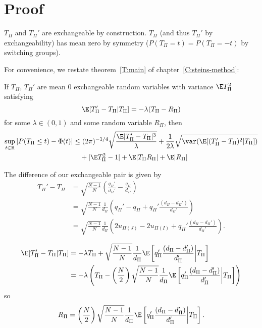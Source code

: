 \section{Proof}
$T_{\Pi}$ and $T_{\Pi}'$ are exchangeable by construction.  $T_{\Pi}$ (and thus $T_{\Pi}'$ by
exchangeability) has mean zero by symmetry ($P(T_{\Pi} = t) = P(T_{\Pi} = -t)$ by
switching groups).

For convenience, we restate theorem~\ref{T:main} of chapter~\ref{C:steins-method}:
\begin{theorem}
  If $T_{\Pi}$, $T_{\Pi}'$ are mean 0 exchangeable random variables with variance $\E T_{\Pi}^2$
  satisfying
  \begin{equation*}
    \E[T_{\Pi}'-T_{\Pi}|T_{\Pi}] = -\lambda(T_{\Pi}-R_{\Pi})    
  \end{equation*}
  for some $\lambda \in (0,1)$ and some random variable $R_{\Pi}$, then 
  \begin{equation*}
    \begin{split}
      \sup_{t \in \mathbb{R}} |P(T_{\Pi} \leq t) - \Phi(t)|
      &\leq (2\pi)^{-1/4} \sqrt{\frac{\E |T_{\Pi}'-T_{\Pi}|^3}{\lambda}}
      + \frac{1}{2\lambda} \sqrt{\var (\E [(T_{\Pi}'-T_{\Pi})^2|T_{\Pi}])} \\
      &\quad + |\E T_{\Pi}^2 - 1| + \E |T_{\Pi}R_{\Pi}| + \E |R_{\Pi}|
    \end{split}
  \end{equation*}
\end{theorem}

The difference of our exchangeable pair is given by
\begin{align}
  T_{\Pi}' - T_{\Pi}
  &= \sqrt{\frac{N-1}{N}}\left (\frac{q_{\Pi}'}{d_{\Pi}'}-\frac{q_{\Pi}}{d_{\Pi}}\right )
  \nonumber \\
  &= \sqrt{\frac{N-1}{N}}\frac{1}{d_{\Pi}}\left (q_{\Pi}' - q_{\Pi} +
    q_{\Pi}' \frac{(d_{\Pi}-d_{\Pi}')}{d_{\Pi}'}\right ) \nonumber \\
  &= \sqrt{\frac{N-1}{N}}\frac{1}{d_{\Pi}}\left
    (2u_{\Pi(J)} - 2u_{\Pi(I)} + q_{\Pi}' \frac{(d_{\Pi}-d_{\Pi}')}{d_{\Pi}'}\right ). \label{def:ttpcubed}
\end{align}

\begin{align*}
  \E[T_{\Pi}'-T_{\Pi}|T_{\Pi}] 
  &= - \lambda T_{\Pi} + \sqrt{\frac{N-1}{N}}\frac{1}{d_{\Pi}}
  \E\left [q_{\Pi}' \frac{(d_{\Pi}-d_{\Pi}')}{d_{\Pi}'}\middle |T_{\Pi} \right ] \\
  &= - \lambda \left ( T_{\Pi} - \left ( \frac{N}{2} \right ) 
    \sqrt{\frac{N-1}{N}}\frac{1}{d_{\Pi}}
    \E\left [q_{\Pi}' \frac{(d_{\Pi}-d_{\Pi}')}{d_{\Pi}'}\middle |T_{\Pi} \right ] \right ) 
\end{align*}
so 
\begin{equation}
  \label{def:Rdef}
  R_{\Pi} = \left (\frac{N}{2}\right )\sqrt{\frac{N-1}{N}}\frac{1}{d_{\Pi}}\E
  \left [q_{\Pi}'\frac{(d_{\Pi}-d_{\Pi}')}{d_{\Pi}'} \middle | T_{\Pi} \right ].
\end{equation}

